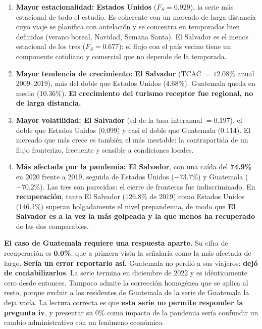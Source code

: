 \documentclass[12pt,letterpaper]{article}
\begin{document}
\begin{enumerate}[label=\roman*.,leftmargin=1.8em,itemsep=4pt]
  \item \textbf{Mayor estacionalidad: Estados Unidos} ($F_S = 0.929$), la serie más estacional
  de todo el estudio. Es coherente con un mercado de larga distancia cuyo viaje se planifica con
  antelación y se concentra en temporadas bien definidas (verano boreal, Navidad, Semana Santa).
  El Salvador es el menos estacional de los tres ($F_S = 0.677$): el flujo con el país vecino
  tiene un componente cotidiano y comercial que no depende de la temporada.
  \item \textbf{Mayor tendencia de crecimiento: El Salvador} (TCAC $= 12.08\%$ anual
  2009--2019), más del doble que Estados Unidos (4.68\%). Guatemala queda en medio (10.36\%).
  \textbf{El crecimiento del turismo receptor fue regional, no de larga distancia.}
  \item \textbf{Mayor volatilidad: El Salvador} (sd de la tasa interanual $= 0.197$), el doble
  que Estados Unidos (0.099) y casi el doble que Guatemala (0.114). El mercado que más crece es
  también el más inestable: la contrapartida de un flujo fronterizo, frecuente y sensible a
  condiciones locales.
  \item \textbf{Más afectada por la pandemia: El Salvador}, con una caída del \textbf{74.9\%} en
  2020 frente a 2019, seguida de Estados Unidos ($-73.7\%$) y Guatemala ($-70.2\%$). Las tres
  son parecidas: el cierre de fronteras fue indiscriminado. En \textbf{recuperación}, tanto
  El Salvador (126.8\% de 2019) como Estados Unidos (146.1\%) superan holgadamente el nivel
  prepandemia, de modo que \textbf{El Salvador es a la vez la más golpeada y la que menos ha
  recuperado} de las dos comparables.
\end{enumerate}

\textbf{El caso de Guatemala requiere una respuesta aparte.} Su cifra de recuperación es
\textbf{0.0\%}, que a primera vista la señalaría como la más afectada de largo. \textbf{Sería un
error reportarlo así.} Guatemala no perdió a sus viajeros: \textbf{dejó de contabilizarlos}. La
serie termina en diciembre de 2022 y es idénticamente cero desde entonces. Tampoco admite la
corrección homogénea que se aplica al resto, porque excluir a los residentes de Guatemala de la
serie de Guatemala la deja vacía. La lectura correcta es que \textbf{esta serie no permite
responder la pregunta iv}, y presentar su 0\% como impacto de la pandemia sería confundir un
cambio administrativo con un fenómeno económico.
\end{document}
